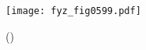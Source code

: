     \begin{figure}[ht!] %
      \centering
      \texttt{[image: fyz\_fig0599.pdf]}
      \caption{
               (\cite[s.~707]{Feynman02})}
      \label{fyz:fig0599}
    \end{figure}


